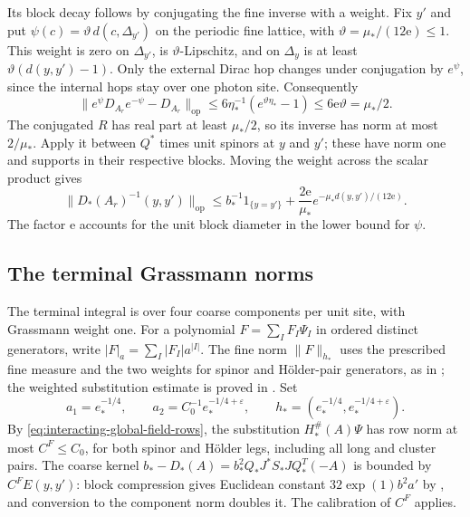 Its block decay follows by conjugating the fine
inverse with a weight. Fix $y'$ and put
$\psi(c)=\vartheta\,d(c,\Delta_{y'})$ on the
periodic fine lattice, with
$\vartheta=\mu_*/(12\mathrm e)\le1$.
This weight is zero on $\Delta_{y'}$, is
$\vartheta$-Lipschitz, and on $\Delta_y$ is
at least $\vartheta(d(y,y')-1)$.
Only the external Dirac hop changes under
conjugation by $e^\psi$, since the internal
hops stay over one photon site. Consequently
\[
 \|e^\psi D_{A_r}e^{-\psi}-D_{A_r}\|_{\mathrm{op}}
 \le6\eta_*^{-1}(e^{\vartheta\eta_*}-1)
 \le6\mathrm e\vartheta=\mu_*/2.
\]
The conjugated $R$ has real part at least
$\mu_*/2$, so its inverse has norm at most
$2/\mu_*$. Apply it between $Q^*$ times
unit spinors at $y$ and $y'$; these have
norm one and supports in their respective
blocks. Moving the weight across the
scalar product gives
\begin{equation}\label{eq:interacting-real-covariance-decay}
 \|D_*(A_r)^{-1}(y,y')\|_{\mathrm{op}}
  \le b_*^{-1}1_{\{y=y'\}}+
       \frac{2\mathrm e}{\mu_*}
                       e^{-\mu_*d(y,y')/(12\mathrm e)}.
\end{equation}
The factor $\mathrm e$ accounts for the unit
block diameter in the lower bound for $\psi$.
\subsection{The terminal Grassmann norms}
\label{subsec:interacting-terminal-norms}

The terminal integral is over four coarse
components per unit site, with Grassmann
weight one. For a polynomial
$F=\sum_I F_I\Psi_I$ in ordered distinct generators,
write $|F|_a=\sum_I|F_I|a^{|I|}$.
The fine norm $\|F\|_{h_*}$ uses the prescribed fine measure
and the two weights for spinor and H\"older-pair generators,
as in \cite[(4)--(5)]{NormalizedContraction};
the weighted substitution estimate is proved in
\cite[Proposition~5.1]{FermionBlock}.
Set
\[
 a_1=e_*^{-1/4},\qquad
 a_2=C_0^{-1}e_*^{-1/4+\varepsilon},\qquad
 h_*=(e_*^{-1/4},e_*^{-1/4+\varepsilon}).
\]
By \eqref{eq:interacting-global-field-rows},
the substitution $H_*^\#(A)\Psi$ has row
norm at most $C^F\le C_0$, for both spinor
and H\"older legs, including all long
and cluster pairs. The coarse kernel
$b_*-D_*(A)=b_*^2Q_*J^*S_*JQ_*^T(-A)$
is bounded by $C^FE(y,y')$: block
compression gives Euclidean constant
$32\exp(1)b^2a'$ by
\cite[(60)]{FermionBlock}, and
conversion to the component norm doubles
it. The calibration of $C^F$ applies.

